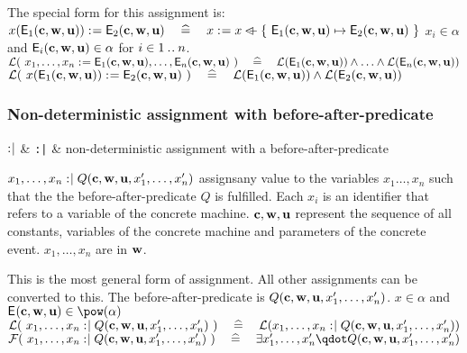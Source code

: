 \begin{samepage}
\begin{rodinrefentry}
    The special form for this assignment is:\\
    $x(\textsf{E}_{1}(\mathbf{c},\mathbf{w},\mathbf{u})) \mathrel{:\mkern1mu=} \textsf{E}_{2}(\mathbf{c},\mathbf{w},\mathbf{u})
      \quad\mathrel{\widehat=}\quad 
      x \mathrel{:\mkern1mu=} x \mathbin{\lhd\mkern-9mu-} \{~\textsf{E}_{1}(\mathbf{c},\mathbf{w},\mathbf{u}) \mapsto \textsf{E}_{2}(\mathbf{c},\mathbf{w},\mathbf{u})~\}$
  \rrtypes
    $x_i\in\alpha$ and  $\textsf{E}_{i}(\mathbf{c},\mathbf{w},\mathbf{u})\in\alpha$ for $i \in 1\mathbin{.\mkern1mu.} n$.
  \rrwd
    $\mathcal{L}(~x_1,\ldots,x_n \mathrel{:\mkern1mu=} \textsf{E}_{1}(\mathbf{c},\mathbf{w},\mathbf{u}),\ldots,\textsf{E}_{n}(\mathbf{c},\mathbf{w},\mathbf{u})~)
      \quad\mathrel{\widehat=}\quad 
      \mathcal{L}(\textsf{E}_{1}(\mathbf{c},\mathbf{w},\mathbf{u})) \land \ldots \land \mathcal{L}(\textsf{E}_{n}(\mathbf{c},\mathbf{w},\mathbf{u}))$ \\
    $\mathcal{L}(~x(\textsf{E}_{1}(\mathbf{c},\mathbf{w},\mathbf{u})) \mathrel{:\mkern1mu=} \textsf{E}_{2}(\mathbf{c},\mathbf{w},\mathbf{u})~)
    \quad\mathrel{\widehat=}\quad 
    \mathcal{L}(\textsf{E}_{1}(\mathbf{c},\mathbf{w},\mathbf{u})) \land \mathcal{L}(\textsf{E}_{2}(\mathbf{c},\mathbf{w},\mathbf{u}))$
\end{rodinrefentry}
\end{samepage}

\begin{samepage}
\subsubsection{Non-deterministic assignment with before-after-predicate}
\label{nondeterministic_assignments}
\begin{rrnames}
  $\mathrel{:\mkern1mu\mid}$ & \texttt{:|} & non-deterministic assignment with a before-after-predicate
\end{rrnames}
\begin{rodinrefentry}
  \rrdesc
    $x_1,\ldots,x_n \mathrel{:\mkern1mu\mid} Q(\mathbf{c},\mathbf{w},\mathbf{u},x_1',\ldots,x_n')$
    assignsany value to the variables $x_1\ldots,x_n$ such that the the
    before-after-predicate $Q$ is fulfilled.
    Each $x_i$ is an identifier that refers to a variable of the concrete machine.
    $\mathbf{c},\mathbf{w},\mathbf{u}$ represent the sequence of all constants, 
    variables of the concrete machine and parameters of the concrete event.
    $x_1,\ldots,x_n$ are in $\mathbf{w}$.

    This is the most general form of assignment. All other assignments can be converted to this.
  \rrdef
    The before-after-predicate is $Q(\mathbf{c},\mathbf{w},\mathbf{u},x_1',\ldots,x_n')$.
  \rrtypes
    $x\in\alpha$ and $\eventbassignmentexpr{}\in\pow(\alpha)$
  \rrwd
    $\mathcal{L}(~x_1,\ldots,x_n \mathrel{:\mkern1mu\mid} Q(\mathbf{c},\mathbf{w},\mathbf{u},x_1',\ldots,x_n')~)
    \quad\mathrel{\widehat=}\quad
    \mathcal{L}(x_1,\ldots,x_n \mathrel{:\mkern1mu\mid} Q(\mathbf{c},\mathbf{w},\mathbf{u},x_1',\ldots,x_n'))$
  \rrfis
    $\actfis(~x_1,\ldots,x_n \bcmsuch Q(\allconstants,\concvariables,\concparameters,x_1',\ldots,x_n')~)
      \quad\defi\quad
      \exists x_1',\ldots,x_n' \qdot Q(\allconstants,\concvariables,\concparameters,x_1',\ldots,x_n')$
\end{rodinrefentry}
\end{samepage}

